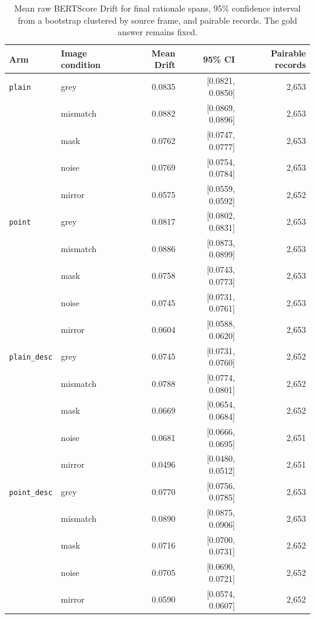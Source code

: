 \begin{table}[ht]
\centering
\caption[Stage~2 BERTScore Drift by image condition]{Mean raw BERTScore Drift
for final rationale spans, 95\% confidence interval from a bootstrap clustered
by source frame, and pairable records. The gold answer remains fixed.}
\label{tab:rq2-drift}
\begin{tabular}{llrrr}
\toprule
Arm & Image condition & Mean Drift & 95\% CI & Pairable records \\
\midrule
\texttt{plain} & grey & 0.0835 & [0.0821, 0.0850] & 2,653 \\
 & mismatch & 0.0882 & [0.0869, 0.0896] & 2,653 \\
 & mask & 0.0762 & [0.0747, 0.0777] & 2,653 \\
 & noise & 0.0769 & [0.0754, 0.0784] & 2,653 \\
 & mirror & 0.0575 & [0.0559, 0.0592] & 2,652 \\
\texttt{point} & grey & 0.0817 & [0.0802, 0.0831] & 2,653 \\
 & mismatch & 0.0886 & [0.0873, 0.0899] & 2,653 \\
 & mask & 0.0758 & [0.0743, 0.0773] & 2,653 \\
 & noise & 0.0745 & [0.0731, 0.0761] & 2,653 \\
 & mirror & 0.0604 & [0.0588, 0.0620] & 2,653 \\
\texttt{plain\_desc} & grey & 0.0745 & [0.0731, 0.0760] & 2,652 \\
 & mismatch & 0.0788 & [0.0774, 0.0801] & 2,652 \\
 & mask & 0.0669 & [0.0654, 0.0684] & 2,652 \\
 & noise & 0.0681 & [0.0666, 0.0695] & 2,651 \\
 & mirror & 0.0496 & [0.0480, 0.0512] & 2,651 \\
\texttt{point\_desc} & grey & 0.0770 & [0.0756, 0.0785] & 2,653 \\
 & mismatch & 0.0890 & [0.0875, 0.0906] & 2,653 \\
 & mask & 0.0716 & [0.0700, 0.0731] & 2,652 \\
 & noise & 0.0705 & [0.0690, 0.0721] & 2,652 \\
 & mirror & 0.0590 & [0.0574, 0.0607] & 2,652 \\
\bottomrule
\end{tabular}
\end{table}
